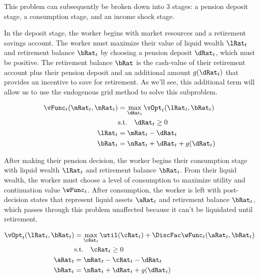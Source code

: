 \documentclass[\econtexRoot/SequentialEGM]{subfiles}
\begin{document}
This problem can subsequently be broken down into 3 stages: a pension deposit stage, a consumption stage, and an income shock stage.

In the deposit stage, the worker begins with market resources and a retirement savings account. The worker must maximize their value of liquid wealth $\lRat_{t}$ and retirement balance $\bRat_{t}$ by choosing a pension deposit $\dRat_{t}$, which must be positive. The retirement balance $\bRat$ is the cash-value of their retirement account plus their pension deposit and an additional amount $g(\dRat_{t})$ that provides an incentive to save for retirement. As we'll see, this additional term will allow us to use the endogenous grid method to solve this subproblem.

\begin{equation}
    \begin{split}
        \vFunc_{t}(\mRat_{t}, \nRat_{t}) & = \max_{\dRat_{t}} \vOpt_{t}(\lRat_{t}, \bRat_{t}) \\
        & \text{s.t.}  \quad \dRat_{t} \ge 0 \\
        \lRat_{t} & = \mRat_{t} - \dRat_{t} \\
        \bRat_{t} & = \nRat_{t} + \dRat_{t} + g(\dRat_{t})
    \end{split}
\end{equation}

After making their pension decision, the worker begins their consumption stage with liquid wealth $\lRat_{t}$ and retirement balance $\bRat_{t}$. From their liquid wealth, the worker must choose a level of consumption to maximize utility and continuation value $\wFunc_{t}$. After consumption, the worker is left with post-decision states that represent liquid assets $\aRat_{t}$ and retirement balance $\bRat_{t}$, which passes through this problem unaffected because it can't be liquidated until retirement.

\begin{equation}
    \begin{split}
        \vOpt_{t}(\lRat_{t}, \bRat_{t}) & = \max_{\cRat_{t}} \util(\cRat_{t}) + \DiscFac \wFunc_{t}(\aRat_{t}, \bRat_{t})  \\
        & \text{s.t.} \quad \cRat_{t} \ge 0 \\
        \aRat_{t} & = \mRat_{t} - \cRat_{t} - \dRat_{t} \\
        \bRat_{t} & = \nRat_{t} + \dRat_{t} + g(\dRat_{t})
    \end{split}
\end{equation}
\end{document}
